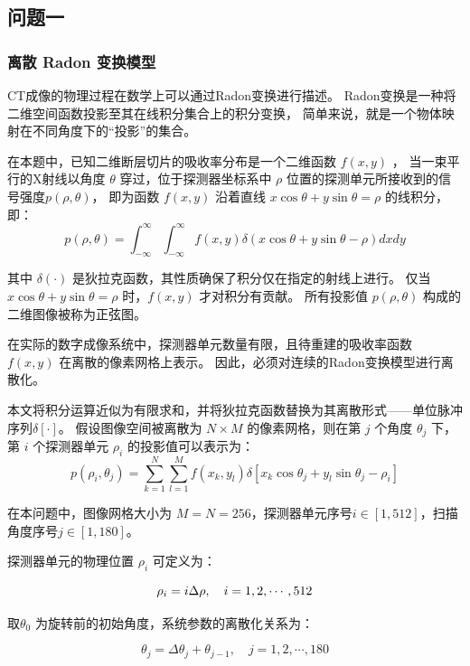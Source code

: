\subsection{问题一}

\subsubsection{离散 Radon 变换模型}

CT成像的物理过程在数学上可以通过Radon变换进行描述。
Radon变换是一种将二维空间函数投影至其在线积分集合上的积分变换，
简单来说，就是一个物体映射在不同角度下的“投影”的集合。\par

在本题中，已知二维断层切片的吸收率分布是一个二维函数 $f(x,y)$ ，
当一束平行的X射线以角度 $\theta$ 穿过，位于探测器坐标系中 $\rho$ 位置的探测单元所接收到的信号强度$p(\rho,\theta)$，
即为函数 $f(x,y)$ 沿着直线 $x\cos\theta+y\sin\theta=\rho$ 的线积分，即：
$$p(\rho,\theta)=\int_{-\infty}^{\infty}\int_{-\infty}^{\infty}f(x,y)\delta(x\cos\theta+y\sin\theta-\rho)dxdy$$

其中 $\delta(\cdot)$ 是狄拉克函数，其性质确保了积分仅在指定的射线上进行。
仅当 $x\cos\theta+y\sin\theta=\rho$ 时，$f(x,y)$ 才对积分有贡献。
所有投影值 $p(\rho,\theta)$ 构成的二维图像被称为正弦图。\par

在实际的数字成像系统中，探测器单元数量有限，且待重建的吸收率函数 $f(x,y)$ 在离散的像素网格上表示。
因此，必须对连续的Radon变换模型进行离散化。

本文将积分运算近似为有限求和，并将狄拉克函数替换为其离散形式——单位脉冲序列$\delta[\cdot]$。
假设图像空间被离散为 $N \times M$ 的像素网格，则在第 $j$ 个角度 $\theta_j$ 下，第 $i$ 个探测器单元 $\rho_i$ 的投影值可以表示为：
$$p(\rho_i,\theta_j)=\sum_{k=1}^{N}\sum_{l=1}^{M}f(x_k,y_l)\delta[x_k\cos\theta_j+y_l\sin\theta_j-\rho_i]$$

在本问题中，图像网格大小为 $M=N=256$，探测器单元序号$i \in [1,512]$，扫描角度序号$j \in [1,180]$。

探测器单元的物理位置 $\rho_i$ 可定义为：

\begin{equation*}
\rho_i = i\Delta\rho, \quad i=1,2,\cdots,512 \\
\end{equation*}

取$\theta_0$ 为旋转前的初始角度，系统参数的离散化关系为：

\begin{equation*}
\theta_j = \Delta\theta_j + \theta_{j-1}, \quad j=1,2,\cdots,180
\end{equation*}

